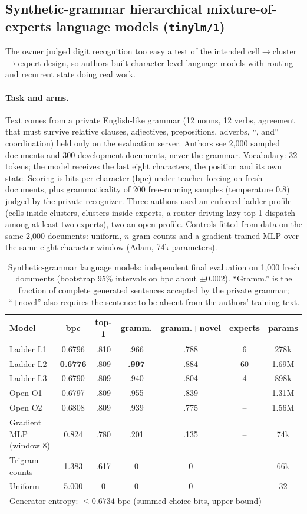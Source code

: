 \documentclass[11pt]{article}
\begin{document}
\subsection{Synthetic-grammar hierarchical mixture-of-experts language models (\texttt{tinylm/1})}\label{sec:exp2}
The owner judged digit recognition too easy a test of the intended cell$\to$cluster$\to$expert
design, so authors built character-level language models with routing and recurrent state doing
real work.

\paragraph{Task and arms.} Text comes from a private English-like grammar (12 nouns, 12 verbs,
agreement that must survive relative clauses, adjectives, prepositions, adverbs, ``, and''
coordination) held only on the evaluation server. Authors see 2{,}000 sampled documents and 300
development documents, never the grammar. Vocabulary: 32 tokens; the model receives the last
eight characters, the position and its own state. Scoring is bits per character (bpc) under
teacher forcing on fresh documents, plus grammaticality of 200 free-running samples
(temperature 0.8) judged by the private recognizer. Three authors used an enforced ladder
profile (cells inside clusters, clusters inside experts, a router driving lazy top-1 dispatch
among at least two experts), two an open profile. Controls fitted from data on the same 2{,}000
documents: uniform, $n$-gram counts and a gradient-trained MLP over the same eight-character
window (Adam, 74k parameters).

\begin{table}[!htbp]
\centering\small
\begin{tabular}{lcccccc}
\toprule
Model & bpc & top-1 & gramm. & gramm.+novel & experts & params\\
\midrule
Ladder L1 & 0.6796 & .810 & .966 & .788 & 6 & 278k\\
Ladder L2 & \textbf{0.6776} & .809 & \textbf{.997} & .884 & 60 & 1.69M\\
Ladder L3 & 0.6790 & .809 & .940 & .804 & 4 & 898k\\
Open O1 & 0.6797 & .809 & .955 & .839 & -- & 1.31M\\
Open O2 & 0.6808 & .809 & .939 & .775 & -- & 1.56M\\
\midrule
Gradient MLP (window 8) & 0.824 & .780 & .201 & .135 & -- & 74k\\
Trigram counts & 1.383 & .617 & 0 & 0 & -- & 66k\\
Uniform & 5.000 & 0 & 0 & 0 & -- & 32\\
\midrule
\multicolumn{7}{l}{Generator entropy: $\leq0.6734$ bpc (summed choice bits, upper bound)}\\
\bottomrule
\end{tabular}
\caption{Synthetic-grammar language models: independent final evaluation on 1{,}000 fresh
documents (bootstrap 95\% intervals on bpc about $\pm0.002$). ``Gramm.'' is the fraction of
complete generated sentences accepted by the private grammar; ``+novel'' also requires the
sentence to be absent from the authors' training text.}
\label{tab:exp2}
\end{table}
\end{document}
